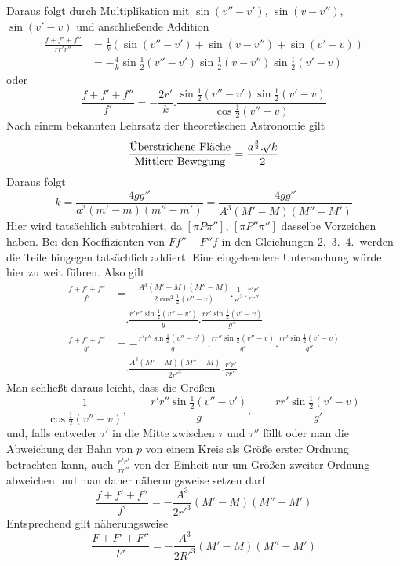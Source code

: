 Daraus folgt durch Multiplikation mit $\sin(v''-v')$, $\sin(v-v'')$, $\sin(v'-v)$ und anschließende Addition
\[
\begin{aligned}
\frac{f+f'+f''}{rr'r''}&=\frac1k(\sin(v''-v')+\sin(v-v'')+\sin(v'-v))\\
&=-\frac4k\sin\tfrac12(v''-v')\sin\tfrac12(v-v'')\sin\tfrac12(v'-v)
\end{aligned}
\]
oder
\[
\frac{f+f'+f''}{f'}=-\frac{2r'}k.\frac{\sin\tfrac12(v''-v')\sin\tfrac12(v'-v)}{\cos\tfrac12(v''-v)}
\]
Nach einem bekannten Lehrsatz der theoretischen Astronomie gilt
\[
\frac{\text{Überstrichene Fläche}}{\text{Mittlere Bewegung}}=\frac{a^{\frac32}.\mathord{{}^{}\!\surd}k}2
\]
Daraus folgt
\[
k=\frac{4gg''}{a^3(m'-m)(m''-m')}=\frac{4gg''}{A^3(M'-M)(M''-M')}
\]
%
\expandafter\def\csname HistoricalNoteText11\endcsname{Hier wird tatsächlich subtrahiert, da $[\pi P\pi'']$, $[\pi P''\pi'']$ dasselbe Vorzeichen haben. Bei den Koeffizienten von $Ff''-F''f$ in den Gleichungen 2.\ 3.\ 4.\ werden die Teile hingegen tatsächlich addiert. Eine eingehendere Untersuchung würde hier zu weit führen.}%
Also gilt
\[
\begin{aligned}
\frac{f+f'+f''}{f'}&=-\frac{A^3(M'-M)(M''-M)}{2\cos^2\tfrac12(v''-v)}.\frac1{r'^3}.\frac{r'r'}{rr''}\\&\quad.\frac{r'r''\sin\tfrac12(v''-v')}{g}.\frac{rr'\sin\tfrac12(v'-v)}{g''}\\
\frac{f+f'+f''}{g'}&=-\frac{r'r''\sin\tfrac12(v''-v')}{g}.\frac{rr''\sin\tfrac12(v''-v)}{g'}.\frac{rr'\sin\tfrac12(v'-v)}{g''}\\&\quad.\frac{A^3(M'-M)(M''-M)}{2r'^3}.\frac{r'r'}{rr''}
\end{aligned}
\]
Man schließt daraus leicht, dass die Größen
\[
\frac1{\cos\tfrac12(v''-v)},\qquad\frac{r'r''\sin\tfrac12(v''-v')}{g},\qquad\frac{rr'\sin\tfrac12(v'-v)}{g'}
\]
und, falls entweder $\tau'$ in die Mitte zwischen $\tau$ und $\tau''$ fällt oder man die Abweichung der Bahn von $p$ von einem Kreis als Größe erster Ordnung betrachten kann, auch $\frac{r'r'}{rr''}$ von der Einheit nur um Größen zweiter Ordnung abweichen und man daher näherungsweise setzen darf
\[
\frac{f+f'+f''}{f'}=-\frac{A^3}{2r'^3}(M'-M)(M''-M')
\]
Entsprechend gilt näherungsweise
\[
\frac{F+F'+F''}{F'}=-\frac{A^3}{2R'^3}(M'-M)(M''-M')
\]

